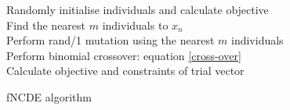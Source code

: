\begin{algorithm}[!ht]
\SetAlgoNoLine
 Randomly initialise individuals and calculate objective\\
 {
  {
  Find the nearest $m$ individuals to $x_n$\\
  Perform rand/1 mutation using the nearest $m$ individuals\\
  Perform binomial crossover: equation \ref{cross-over}\\
  Calculate objective and constraints of trial vector
  }
 }
 \caption{fNCDE algorithm}
 \label{fNCDE algorithm}
\end{algorithm}